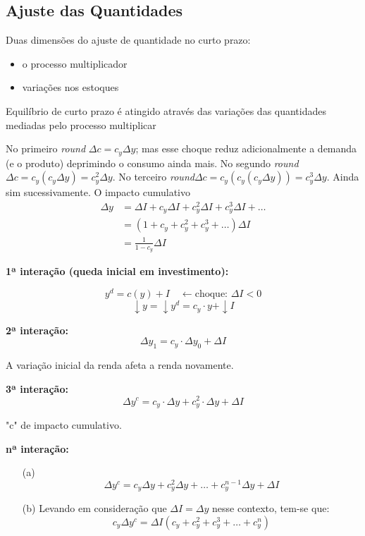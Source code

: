 \documentclass[a4paper,12pt]{article}[abntex2]
\begin{document}
\subsection{\textbf{Ajuste das Quantidades}}
Duas dimensões do ajuste de quantidade no curto prazo:\begin{itemize}
    \item o processo multiplicador
    \item variações nos estoques
\end{itemize}

Equilíbrio de curto prazo é atingido através das variações das quantidades mediadas pelo processo multiplicar

No primeiro \textit{round} $\Delta c=c_y\Delta y$; mas esse choque reduz adicionalmente a demanda (e o produto) deprimindo o consumo ainda mais. No segundo \textit{round} $\Delta c=c_y(c_y\Delta y)=c_y^2\Delta y$. No terceiro \textit{round}$\Delta c=c_y(c_y(c_y\Delta y))=c_y^3\Delta y$. Ainda sim sucessivamente. O impacto cumulativo 
\begin{align*}
    \Delta y &= \Delta I + c_y \Delta I + c_y^2 \Delta I + c_y^3 \Delta I + \dots \\
             &= (1 + c_y + c_y^2 + c_y^3 + \dots)\Delta I \\
             &= \frac{1}{1 - c_y} \Delta I
\end{align*}

\textbf{1ª interação (queda inicial em investimento):}

\[
y^d = c(y) + I \quad \leftarrow \text{choque: } \Delta I < 0
\]
\[
\downarrow y = \downarrow y^d = c_y \cdot y + \downarrow I
\]

\textbf{2ª interação:}
\[
\Delta y_1 = c_y \cdot \Delta y_0 + \Delta I
\]

A variação inicial da renda afeta a renda novamente.

\textbf{3ª interação:}
\[
\Delta y^c = c_y \cdot \Delta y + c_y^2 \cdot \Delta y + \Delta I
\]

"c" de impacto cumulativo.

\textbf{nª interação:}

\begin{enumerate}
    \item[(a)] 
    \[
    \Delta y^c = c_y \Delta y + c_y^2 \Delta y + \dots + c_y^{n-1} \Delta y + \Delta I
    \]
    \item[(b)] Levando em consideração que \( \Delta I = \Delta y \) nesse contexto, tem-se que:
    \[
    c_y \Delta y^c = \Delta I (c_y + c_y^2 + c_y^3 + \dots + c_y^n)
    \]
\end{enumerate}
\end{document}
